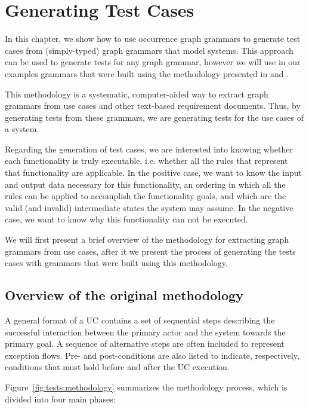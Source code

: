 \chapter{Generating Test Cases}\label{ch:tests}

In this chapter, we show how to use occurrence graph grammars to generate test cases from (simply-typed) graph grammars that model systems. This approach can be used to generate tests for any graph grammar, however we will use in our examples grammars that were built using the methodology presented in \cite{Junior2015} and \cite{BezerraWEIT2016}.

This methodology is a systematic, computer-aided way to extract graph grammars from use cases and other text-based requirement documents. Thus, by generating tests from these grammars, we are generating tests for the use cases of a system.

Regarding the generation of test cases, we are interested into knowing whether each functionality is truly executable, i.e. whether all the rules that represent that functionality are applicable. In the positive case, we want to know the input and output data necessary for this functionality, an ordering in which all the rules can be applied to accomplish the functionality goals, and which are the valid (and invalid) intermediate states the system may assume. In the negative case, we want to know why this functionality can not be executed.

We will first present a brief overview of the methodology for extracting graph grammars from use cases, after it we present the process of generating the tests cases with grammars that were built using this methodology.

\section{Overview of the original methodology}  A general format of a UC contains a set of sequential steps describing the successful interaction between the primary actor and the system towards the primary goal. A sequence of alternative steps are often included to represent exception flows. Pre- and post-conditions are also listed to indicate, respectively, conditions that must hold before and after the UC execution.

Figure~\ref{fig:tests:methodology} summarizes the methodology process, which is divided into four main phases:

